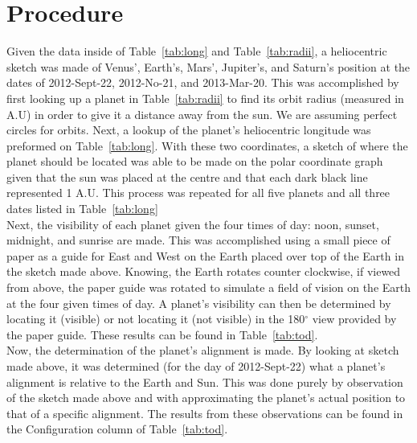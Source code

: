 \documentclass{article}
\begin{document}

\section{Procedure}

Given the data inside of Table~\ref{tab:long} and Table~\ref{tab:radii}, a heliocentric sketch was made of Venus', Earth's, Mars', 
Jupiter's, and Saturn's position at the dates of 2012-Sept-22, 2012-No-21, and 2013-Mar-20. This was accomplished by first
looking up a planet in Table~\ref{tab:radii} to find its orbit radius (measured in A.U) in order to give it a distance away from the
sun. We are assuming perfect circles for orbits. Next, a lookup of the planet's heliocentric longitude was preformed on 
Table~\ref{tab:long}. With these two coordinates, a sketch of where the planet should be located was able to be made on the 
polar coordinate graph given that the sun was placed at the centre and that each dark black line represented 1 A.U. This process
was repeated for all five planets and all three dates listed in Table~\ref{tab:long}\\

Next, the visibility of each planet given the four times of day: noon, sunset, midnight, and sunrise are made. This was accomplished
using a small piece of paper as a guide for East and West on the Earth placed over top of the Earth in the sketch made above. Knowing,
the Earth rotates counter clockwise, if viewed from above, the paper guide was rotated to simulate a field of vision on the Earth at
the four given times of day. A planet's visibility can then be determined by locating it (visible) or not locating it (not visible) in the
180$^\circ$ view provided by the paper guide. These results can be found in Table~\ref{tab:tod}.\\

Now, the determination of the planet's alignment is made. By looking at sketch made above, it was determined (for the day of
2012-Sept-22) what a planet's alignment is relative to the Earth and Sun. This was done purely by observation of the sketch
made above and with 
approximating the planet's actual position to that of a specific alignment. The results from these observations can be found
in the Configuration column of Table~\ref{tab:tod}.\\
\end{document}
